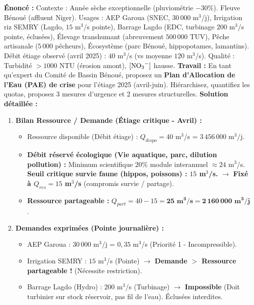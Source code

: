 \documentclass[11pt]{article}
\begin{document}
\begin{exoresolu}
    \textbf{Énoncé :} Contexte : Année sèche exceptionnelle (pluviométrie $-30\%$). Fleuve Bénoué (affluent Niger). Usages : AEP Garoua (SNEC, $30\,000$ m$^3$/j), Irrigation riz SEMRY (Lagdo, $15$ m$^3$/s pointe), Barrage Lagdo (EDC, turbinage $200$ m$^3$/s pointe, éclusées), Élevage transhumant (abreuvement $500\,000$ TUV), Pêche artisanale ($5\,000$ pêcheurs), Écosystème (parc Bénoué, hippopotames, lamantins). Débit étiage observé (avril 2025) : $40$ m$^3$/s (vs moyenne $120$ m$^3$/s). Qualité : Turbidité $> 1000$ NTU (érosion amont), $[\ce{NO3-}]$ hausse.
    \textbf{Travail :} En tant qu'expert du Comité de Bassin Bénoué, proposez un \textbf{Plan d'Allocation de l'Eau (PAE) de crise} pour l'étiage 2025 (avril-juin). Hiérarchisez, quantifiez les quotas, proposez 3 mesures d'urgence et 2 mesures structurelles.
    \tcblower
    \textbf{Solution détaillée :}
    \begin{enumerate}
        \item \textbf{Bilan Ressource / Demande (Étiage critique - Avril) :}
        \begin{itemize}
            \item Ressource disponible (Débit étiage) : $Q_{dispo} = 40$ m$^3$/s = $3\,456\,000$ m$^3$/j.
            \item \textbf{Débit réservé écologique (Vie aquatique, parc, dilution pollution) :} Minimum scientifique $20\%$ module interannuel $\approx 24$ m$^3$/s. \textbf{Seuil critique survie faune (hippos, poissons) : $15$ m$^3$/s.} $\rightarrow$ \textbf{Fixé à $Q_{res} = 15$ m$^3$/s} (compromis survie / partage).
            \item \textbf{Ressource partageable :} $Q_{part} = 40 - 15 = \mathbf{25 \text{ m}^3/\text{s} = 2\,160\,000 \text{ m}^3/\text{j}}$.
        \end{itemize}
        \item \textbf{Demandes exprimées (Pointe journalière) :}
        \begin{itemize}
            \item AEP Garoua : $30\,000$ m$^3$/j = $0,35$ m$^3$/s (Priorité 1 - Incompressible).
            \item Irrigation SEMRY : $15$ m$^3$/s (Pointe) $\rightarrow$ \textbf{Demande $>$ Ressource partageable !} (Nécessite restriction).
            \item Barrage Lagdo (Hydro) : $200$ m$^3$/s (Turbinage) $\rightarrow$ \textbf{Impossible} (Doit turbinier sur stock réservoir, pas fil de l'eau). Éclusées interdites.

\end{itemize}
\end{enumerate}
\end{exoresolu}
\end{document}
